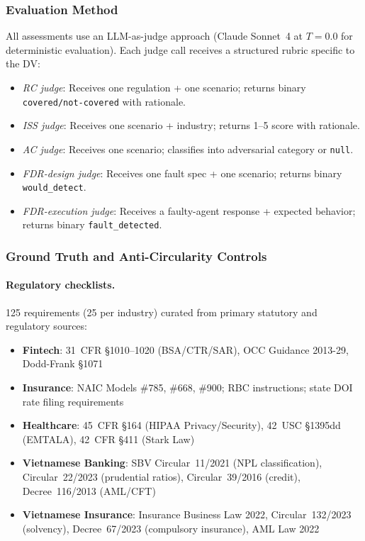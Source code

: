 \documentclass[11pt,a4paper]{article}
\begin{document}
\subsubsection{Evaluation Method}

All assessments use an LLM-as-judge approach (Claude Sonnet~4 at
$T=0.0$ for deterministic evaluation). Each judge call receives a
structured rubric specific to the DV:
\begin{itemize}
  \item \emph{RC judge}: Receives one regulation + one scenario; returns
    binary \texttt{covered/not-covered} with rationale.
  \item \emph{ISS judge}: Receives one scenario + industry; returns
    1--5 score with rationale.
  \item \emph{AC judge}: Receives one scenario; classifies into
    adversarial category or \texttt{null}.
  \item \emph{FDR-design judge}: Receives one fault spec + one scenario;
    returns binary \texttt{would\_detect}.
  \item \emph{FDR-execution judge}: Receives a faulty-agent response +
    expected behavior; returns binary \texttt{fault\_detected}.
\end{itemize}

\subsubsection{Ground Truth and Anti-Circularity Controls}

\paragraph{Regulatory checklists.}
125 requirements (25 per industry) curated from primary statutory and
regulatory sources:
\begin{itemize}
  \item \textbf{Fintech}: 31~CFR \S1010--1020 (BSA/CTR/SAR),
    OCC Guidance 2013-29, Dodd-Frank \S1071
  \item \textbf{Insurance}: NAIC Models \#785, \#668, \#900;
    RBC instructions; state DOI rate filing requirements
  \item \textbf{Healthcare}: 45~CFR \S164 (HIPAA Privacy/Security),
    42~USC \S1395dd (EMTALA), 42~CFR \S411 (Stark Law)
  \item \textbf{Vietnamese Banking}: SBV Circular~11/2021
    (NPL classification), Circular~22/2023 (prudential ratios),
    Circular~39/2016 (credit), Decree~116/2013 (AML/CFT)
  \item \textbf{Vietnamese Insurance}: Insurance Business Law 2022,
    Circular~132/2023 (solvency), Decree~67/2023
    (compulsory insurance), AML Law 2022
\end{itemize}
\end{document}
